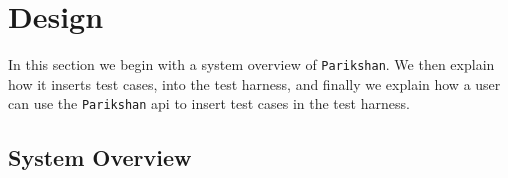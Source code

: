 
\section{Design}

In this section we begin with a system overview of \texttt{Parikshan}. 
We then explain how it inserts test cases, into the test harness, and finally we explain how a user can use the \texttt{Parikshan} api to insert test cases in the test harness.

\subsection{System Overview}

